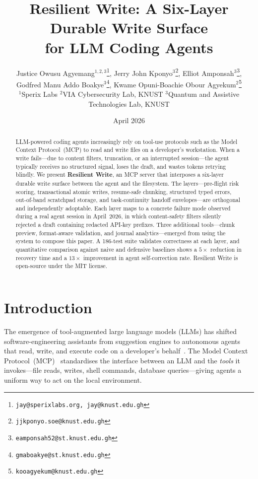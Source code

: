 \documentclass[11pt,twocolumn]{article}
\title{Resilient Write: A Six-Layer Durable Write Surface\\for LLM Coding Agents}
\author{%
Justice Owusu Agyemang$^{1,2,3}$\thanks{\texttt{jay@sperixlabs.org, jay@knust.edu.gh}},\quad
Jerry John Kponyo$^{3}$\thanks{\texttt{jjkponyo.soe@knust.edu.gh}},\quad
Elliot Amponsah$^{3}$\thanks{\texttt{eamponsah52@st.knust.edu.gh}},\\
Godfred Manu Addo Boakye$^{3}$\thanks{\texttt{gmaboakye@st.knust.edu.gh}},\quad
Kwame Opuni-Boachie Obour Agyekum$^{2}$\thanks{\texttt{kooagyekum@knust.edu.gh}}\\[4pt]
{\small $^1$Sperix Labs \qquad $^2$VIA Cybersecurity Lab, KNUST \qquad $^3$Quantum and Assistive Technologies Lab, KNUST}%
}
\date{April 2026}
\begin{document}
\maketitle

\begin{abstract}
LLM-powered coding agents increasingly rely on tool-use protocols
such as the Model Context Protocol~(MCP) to read and write files
on a developer's workstation.  When a write fails---due to content
filters, truncation, or an interrupted session---the agent typically
receives no structured signal, loses the draft, and wastes tokens
retrying blindly.  We present \textbf{Resilient Write}, an MCP
server that interposes a six-layer durable write surface between the
agent and the filesystem.  The layers---pre-flight risk scoring,
transactional atomic writes, resume-safe chunking, structured typed
errors, out-of-band scratchpad storage, and task-continuity
handoff envelopes---are orthogonal and independently adoptable.
Each layer maps to a concrete failure mode observed during a real
agent session in April~2026, in which content-safety filters
silently rejected a draft containing redacted API-key prefixes.
Three additional tools---chunk preview, format-aware validation,
and journal analytics---emerged from using the system to compose
this paper.  A 186-test suite validates correctness at each layer,
and quantitative comparison against naive and defensive baselines
shows a $5\times$ reduction in recovery time and a $13\times$
improvement in agent self-correction rate.  Resilient Write is
open-source under the MIT license.
\end{abstract}

\section{Introduction}
\label{sec:intro}

The emergence of tool-augmented large language models (LLMs) has
shifted software-engineering assistants from suggestion engines to
autonomous agents that read, write, and execute code on a
developer's behalf~\cite{claudecode2025,codex2025,cursor2024,copilot2024}.
The Model Context Protocol~(MCP)~\cite{mcp2024} standardises the
interface between an LLM and the \emph{tools} it invokes---file
reads, writes, shell commands, database queries---giving agents a
uniform way to act on the local environment.
\end{document}

